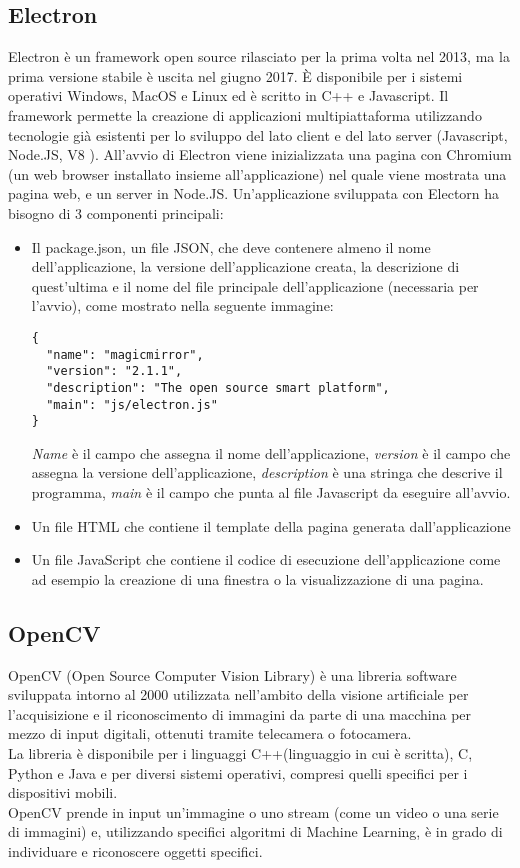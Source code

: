 \subsection{Electron}\label{cap:Electron}
Electron \`e un framework open source rilasciato per la prima volta nel 2013, ma la prima versione
stabile \`e uscita nel giugno 2017. \`E disponibile per i sistemi operativi Windows, MacOS e Linux ed \`e scritto
in C++ e Javascript. Il framework permette la creazione di applicazioni multipiattaforma
utilizzando tecnologie gi\`a esistenti per lo sviluppo
del lato client e del lato server (Javascript, Node.JS, V8 \cite{V8}).
All'avvio di Electron viene inizializzata una pagina con Chromium \cite{Chromium}(un web browser installato insieme all'applicazione)
nel quale viene mostrata una pagina web, e un server in Node.JS.
Un'applicazione sviluppata con Electorn ha bisogno di 3 componenti principali:
\begin{itemize}
\item Il package.json, un file JSON, che deve contenere almeno il nome dell'applicazione,
la versione dell'applicazione creata, la descrizione di quest'ultima e il
 nome del file principale dell'applicazione (necessaria per l'avvio), come mostrato nella
 seguente immagine:
\begin{lstlisting}
{
  "name": "magicmirror",
  "version": "2.1.1",
  "description": "The open source smart platform",
  "main": "js/electron.js"
}
\end{lstlisting}
\emph{Name} \`e il campo che assegna il nome dell'applicazione, \emph{version} \`e il campo che assegna la versione
dell'applicazione, \emph{description} \`e una stringa che descrive il programma, \emph{main} \`e il campo che punta al file
Javascript da eseguire all'avvio.
\item Un file HTML che contiene il template della pagina generata dall'applicazione
\item Un file JavaScript che contiene il codice di esecuzione dell'applicazione come ad esempio la
creazione di una finestra o la visualizzazione di una pagina.
\end{itemize}

\subsection{OpenCV}
OpenCV (Open Source Computer Vision Library) \`e una libreria software sviluppata intorno al 2000
utilizzata nell'ambito della visione artificiale per l'acquisizione e il riconoscimento di immagini
da parte di una macchina per mezzo di input digitali, ottenuti tramite telecamera o fotocamera.\\
La libreria \`e disponibile per i linguaggi C++(linguaggio in cui \`e scritta), C, Python e Java e
per diversi sistemi operativi, compresi quelli specifici per i dispositivi mobili.\\
OpenCV prende in input un'immagine o uno stream (come un video o una serie di immagini) e, utilizzando specifici
algoritmi di Machine Learning, \`e in grado di individuare e riconoscere oggetti specifici.

